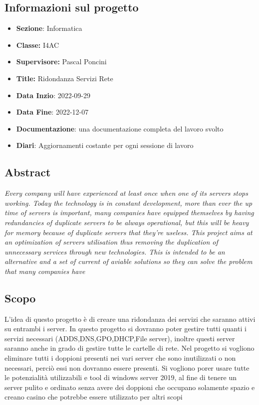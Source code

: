 \documentclass[../main.tex]{subfiles}
\begin{document}
\subsection{Informazioni sul progetto}

  \begin{itemize}
    \item \textbf{Sezione}: Informatica
    \item \textbf{Classe:} I4AC
    \item \textbf{Supervisore:} Pascal Poncini
    \item \textbf{Title:} Ridondanza Servizi Rete
    \item \textbf{Data Inzio}: 2022-09-29
    \item \textbf{Data Fine}: 2022-12-07
\end{itemize}


\begin{itemize}
    \item \textbf{Documentazione}:  una documentazione completa del lavoro svolto
    \item \textbf{Diari}: Aggiornamenti costante per ogni sessione di lavoro
\end{itemize}

\subsection{Abstract}
\textit{Every company will have experienced at least once when one of its servers stops working. Today the technology is in constant development, more than ever the up time of servers is important, many companies have equipped themselves by having redundancies of duplicate servers to be always operational, but this will be heavy for memory because of duplicate servers that they're useless. This project aims at an optimization of servers utilisation thus removing  the duplication of unnecessary services through new technologies. This is intended to be an alternative and a set of current of aviable solutions so they can solve the problem that many companies have}

\subsection{Scopo}

L'idea di questo progetto è di creare una ridondanza dei servizi che saranno attivi su entrambi i server. In questo progetto si dovranno poter gestire tutti quanti i servizi necessari (ADDS,DNS,GPO,DHCP,File server), inoltre questi server saranno anche in grado di gestire tutte le cartelle di rete. Nel progetto si vogliono eliminare tutti i doppioni presenti nei vari server che sono inutilizzati o non necessari, perciò essi non dovranno essere presenti. Si vogliono porer usare tutte le potenzialità utilizzabili e tool di windows server 2019, al fine di tenere un server pulito e ordinato senza avere dei doppioni che occupano solamente spazio e creano casino che potrebbe essere utilizzato per altri scopi
\end{document}
